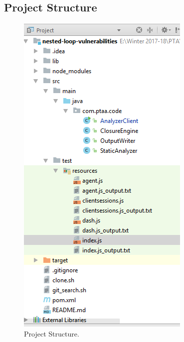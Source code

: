 \documentclass[authoryear,preprint]{sigplanconf}
\begin{document}
\subsection{Project Structure}

\begin{figure}[ht]
\centering
\includegraphics[width=1\linewidth]{figures/project-structure}
\caption[Project Structure]{\label{f:structure}Project Structure.}
\end{figure}
\end{document}

